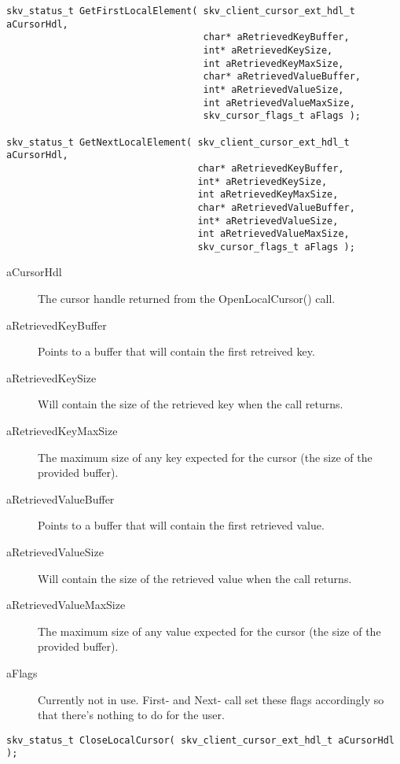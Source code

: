 \begin{lstlisting}
skv_status_t GetFirstLocalElement( skv_client_cursor_ext_hdl_t aCursorHdl,
                                   char* aRetrievedKeyBuffer,
                                   int* aRetrievedKeySize,
                                   int aRetrievedKeyMaxSize,
                                   char* aRetrievedValueBuffer,
                                   int* aRetrievedValueSize,
                                   int aRetrievedValueMaxSize,
                                   skv_cursor_flags_t aFlags );

skv_status_t GetNextLocalElement( skv_client_cursor_ext_hdl_t aCursorHdl,
                                  char* aRetrievedKeyBuffer,
                                  int* aRetrievedKeySize,
                                  int aRetrievedKeyMaxSize,
                                  char* aRetrievedValueBuffer,
                                  int* aRetrievedValueSize,
                                  int aRetrievedValueMaxSize,
                                  skv_cursor_flags_t aFlags );
\end{lstlisting}

\begin{description}
\item[aCursorHdl] The cursor handle returned from the
  OpenLocalCursor() call.
\item[aRetrievedKeyBuffer] Points to a buffer that will contain the
  first retreived key.
\item[aRetrievedKeySize] Will contain the size of the retrieved key
  when the call returns.
\item[aRetrievedKeyMaxSize] The maximum size of any key expected for
  the cursor (\abrIE the size of the provided buffer).
\item[aRetrievedValueBuffer] Points to a buffer that will contain the
  first retrieved value.
\item[aRetrievedValueSize] Will contain the size of the retrieved
  value when the call returns.
\item[aRetrievedValueMaxSize] The maximum size of any value expected
  for the cursor (\abrIE the size of the provided buffer).
\item[aFlags] Currently not in use.  First- and Next- call set these
  flags accordingly so that there's nothing to do for the user.
\end{description}

\begin{lstlisting}
skv_status_t CloseLocalCursor( skv_client_cursor_ext_hdl_t aCursorHdl );
\end{lstlisting}

